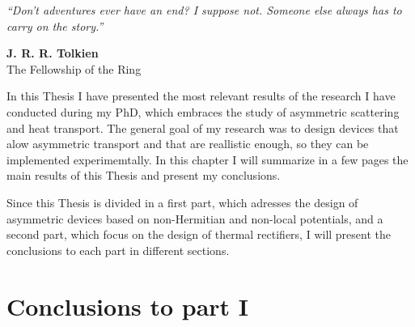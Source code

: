
\label{Conclusions}
\null
\textit{``Don't adventures ever have an end? I suppose not. Someone else always has to carry on the story.''}
\begin{flushright}
  {\bf J. R. R. Tolkien}\\
  The Fellowship of the Ring
\end{flushright}
\null

In this Thesis I have presented the most relevant results of the research I have conducted during my PhD, which embraces the study of asymmetric scattering and heat transport. The general goal of my research was to design devices that alow asymmetric transport and that are reallistic enough, so they can be implemented experimemtally. In this chapter I will summarize in a few pages the main results of this Thesis and present my conclusions.

Since this Thesis is divided in a first part, which adresses the design of asymmetric devices based on non-Hermitian and non-local potentials, and a second part, which focus on the design of thermal rectifiers, I will present the conclusions to each part in different sections.


\section*{Conclusions to part I}

